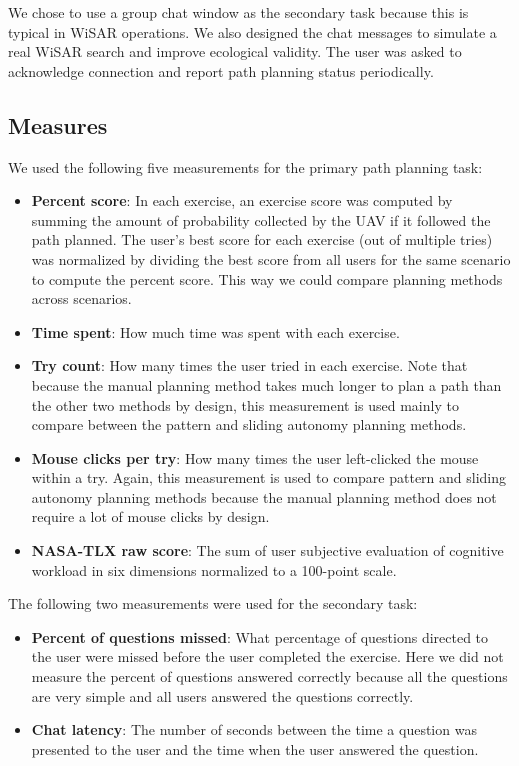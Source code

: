 \documentclass[lettersize, apacite, twoside, HRI]{apa_HRI}
\begin{document}
We chose to use a group chat window as the secondary task because this is typical in WiSAR operations. We also designed the chat messages to simulate a real WiSAR search and improve ecological validity. The user was asked to acknowledge connection and report path planning status periodically.

\subsection{Measures}

We used the following five measurements for the primary path planning task:

\begin{itemize}
\item \textbf{Percent score}: In each exercise, an exercise score was computed by summing the amount of probability collected by the UAV if it followed the path planned. The user's best score for each exercise (out of multiple tries) was normalized by dividing the best score from all users for the same scenario to compute the percent score. This way we could compare planning methods across scenarios.
\item \textbf{Time spent}: How much time was spent with each exercise.
\item \textbf{Try count}: How many times the user tried in each exercise. Note that because the manual planning method takes much longer to plan a path than the other two methods by design, this measurement is used mainly to compare between the pattern and sliding autonomy planning methods.
\item \textbf{Mouse clicks per try}: How many times the user left-clicked the mouse within a try. Again, this measurement is used to compare pattern and sliding autonomy planning methods because the manual planning method does not require a lot of mouse clicks by design.
\item \textbf{NASA-TLX raw score}: The sum of user subjective evaluation of cognitive workload in six dimensions normalized to a 100-point scale. 
\end{itemize}

The following two measurements were used for the secondary task:
\begin{itemize}
\item \textbf{Percent of questions missed}: What percentage of questions directed to the user were missed before the user completed the exercise. Here we did not measure the percent of questions answered correctly because all the questions are very simple and all users answered the questions correctly.
\item \textbf{Chat latency}: The number of seconds between the time a question was presented to the user and the time when the user answered the question.
\end{itemize}
\end{document}
